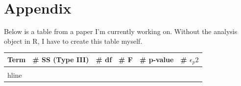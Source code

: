\documentclass{article}\usepackage[]{graphicx}\usepackage[]{xcolor}
\begin{document}
\newpage
\onecolumn
\section{Appendix}

Below is a table from a paper I’m currently working on. Without the analysis object in R, I have to create this table myself.

\begin{table}[H]
\begin{center}
\begin{tabular}{l r r r r r }\hline
Term & \# SS (Type III) & \# df & \# F & \# p-value & \# $\epsilon_p2$ \\
\hline \\hline
\end{tabular} \label{full.sleep.tab}
\end{center}
\end{table}
\end{document}
